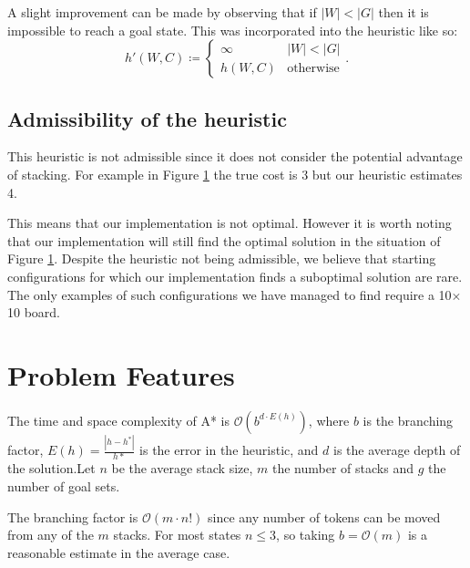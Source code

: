 \documentclass[11pt]{article}
\newcommand{\white}[3] {
  \foreach \x in {0, ..., #3} {
    \draw[fill=white] ({.5+#1},{\x*.1+.5+#2}) circle (0.42) node {#3};
  }
}
\newcommand{\black}[3] {
  \foreach \x in {0, ..., #3} {
    \draw[fill=white!70!black] ({.5+#1},{\x*.1+.5+#2}) circle (0.42) node {#3};
  }
}
\theoremstyle{definition}
\def\defeq{\coloneqq}
\begin{document}
    A slight improvement can be made by observing that if $|W| < |G|$ then it is impossible to reach a goal state. This was incorporated into the heuristic like so:
    \[
        h'(W, C) \defeq \begin{cases}
            \infty & |W| < |G|\\
            h(W, C) & \textrm{otherwise}
        \end{cases}. 
    \]

    \subsection{Admissibility of the heuristic}\label{subsec:admissibility-of-the-heuristic}
    This heuristic is not admissible since it does not consider the potential advantage of stacking. For example in Figure \ref{fig:inadmissable-heuristic} the true cost is $3$ but our heuristic estimates 4.
    \begin{figure}[ht!]
        \centering
        \caption{}
        \label{fig:inadmissable-heuristic}
    \end{figure}
    This means that our implementation is not optimal. However it is worth noting that our implementation will still find the optimal solution in the situation of Figure \ref{fig:inadmissable-heuristic}. Despite the heuristic not being admissible, we believe that starting configurations for which our implementation finds a suboptimal solution are rare. The only examples of such configurations we have managed to find require a 10$\times$10 board.
    \section{Problem Features}
    The time and space complexity of A* is $\mathcal{O}(b^{d \cdot E(h)})$, where $b$ is the branching factor, $E(h) = \frac{|h - h^*|}{h*}$ is the error in the heuristic, and $d$ is the average depth of the solution.Let $n$ be the average stack size, $m$ the number of stacks and $g$ the number of goal sets. 
    
    The branching factor is $\mathcal{O}(m\cdot n!)$ since any number of tokens can be moved from any of the $m$ stacks. For most states $n \leq 3$, so taking $b = \mathcal{O}(m)$ is a reasonable estimate in the average case. 
\end{document}
